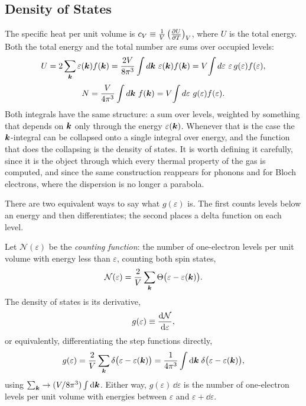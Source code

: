 \subsection{Density of States}

The specific heat per unit volume is $c_V \equiv \frac{1}{V}\left(\pdv{U}{T}\right)_V$, where $U$ is the total energy. Both the total energy and the total number are sums over occupied levels:
\begin{equation}
    U = 2\sum_{\lvect{k}} \varepsilon(\lvect{k}) f(\lvect{k}) = \frac{2V}{8\pi^3}\int d\lvect{k}\ \varepsilon(\lvect{k})f(\lvect{k}) = V\!\int d\varepsilon\ \varepsilon\, g(\varepsilon) f(\varepsilon),
\end{equation}
\begin{equation}
    N = \frac{V}{4\pi^3}\int d\lvect{k}\ f(\lvect{k}) = V\!\int d\varepsilon\ g(\varepsilon)f(\varepsilon).
\end{equation}
Both integrals have the same structure: a sum over levels, weighted by something that depends on $\bm{k}$ only through the energy $\varepsilon(\bm{k})$. Whenever that is the case the $\bm{k}$-integral can be collapsed onto a single integral over energy, and the function that does the collapsing is the density of states. It is worth defining it carefully, since it is the object through which every thermal property of the gas is computed, and since the same construction reappears for phonons and for Bloch electrons, where the dispersion is no longer a parabola.

There are two equivalent ways to say what $g(\varepsilon)$ is. The first counts levels below an energy and then differentiates; the second places a delta function on each level.

\begin{definition}
Let $\mathcal{N}(\varepsilon)$ be the \emph{counting function}: the number of one-electron levels per unit volume with energy less than $\varepsilon$, counting both spin states,
\begin{equation}
    \mathcal{N}(\varepsilon) = \frac{2}{V}\sum_{\bm{k}} \Theta\bigl(\varepsilon - \varepsilon(\bm{k})\bigr).
\end{equation}
The density of states is its derivative,
\begin{equation}
    g(\varepsilon) \equiv \dv{\mathcal{N}}{\varepsilon},
    \label{eq:drude-dos-deriv}
\end{equation}
or equivalently, differentiating the step functions directly,
\begin{equation}
    g(\varepsilon) = \frac{2}{V}\sum_{\bm{k}} \delta\bigl(\varepsilon - \varepsilon(\bm{k})\bigr)
    = \frac{1}{4\pi^3}\int \dd\bm{k}\;\delta\bigl(\varepsilon - \varepsilon(\bm{k})\bigr),
    \label{eq:drude-dos-delta}
\end{equation}
using $\sum_{\bm{k}} \to (V/8\pi^3)\int\dd\bm{k}$. Either way, $g(\varepsilon)\,\dd\varepsilon$ is the number of one-electron levels per unit volume with energies between $\varepsilon$ and $\varepsilon + \dd\varepsilon$.
\end{definition}


